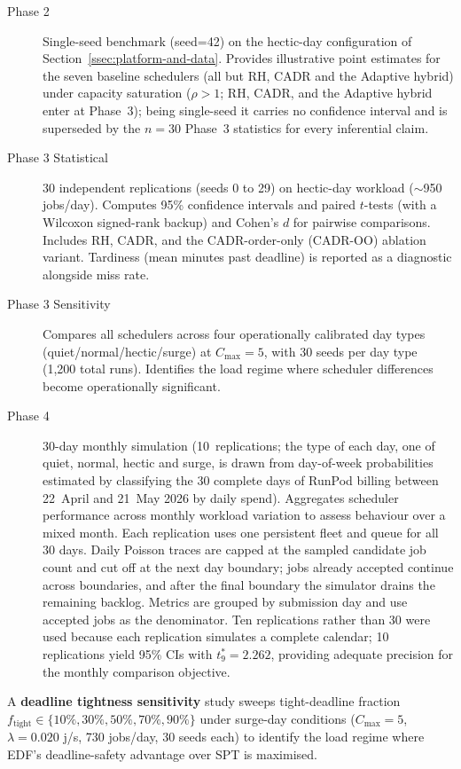 {\begin{description}
  \item[Phase 2] Single-seed benchmark (seed=42) on the hectic-day configuration of Section~\ref{ssec:platform-and-data}. Provides illustrative point estimates for the seven baseline schedulers (all but RH, CADR and the Adaptive hybrid) under capacity saturation ($\rho>1$; RH, CADR, and the Adaptive hybrid enter at Phase~3); being single-seed it carries no confidence interval and is superseded by the $n=30$ Phase~3 statistics for every inferential claim.
  \item[Phase 3 Statistical] 30 independent replications (seeds 0 to 29) on hectic-day workload ($\sim$950 jobs/day). Computes 95\% confidence intervals and paired $t$-tests (with a Wilcoxon signed-rank backup) and Cohen's $d$ for pairwise comparisons. Includes RH, CADR, and the CADR-order-only (CADR-OO) ablation variant. Tardiness (mean minutes past deadline) is reported as a diagnostic alongside miss rate.
  \item[Phase 3 Sensitivity] Compares all schedulers across four operationally calibrated day types (quiet/normal/hectic/surge) at $C_{\max}=5$, with 30 seeds per day type (1{,}200 total runs). Identifies the load regime where scheduler differences become operationally significant.
  \item[Phase 4] 30-day monthly simulation (10~replications; the type of each day, one of quiet, normal, hectic and surge, is drawn from day-of-week probabilities estimated by classifying the 30 complete days of RunPod billing between 22~April and 21~May 2026 by daily spend). Aggregates scheduler performance across monthly workload variation to assess behaviour over a mixed month. Each replication uses one persistent fleet and queue for all 30 days. Daily Poisson traces are capped at the sampled candidate job count and cut off at the next day boundary; jobs already accepted continue across boundaries, and after the final boundary the simulator drains the remaining backlog. Metrics are grouped by submission day and use accepted jobs as the denominator. Ten replications rather than 30 were used because each replication simulates a complete calendar; 10 replications yield 95\% CIs with $t^*_9 = 2.262$, providing adequate precision for the monthly comparison objective.
\end{description}

A \textbf{deadline tightness sensitivity} study sweeps tight-deadline fraction $f_{\text{tight}} \in \{10\%,\allowbreak 30\%,\allowbreak 50\%,\allowbreak 70\%,\allowbreak 90\%\}$ under surge-day conditions ($C_{\max}=5$, $\lambda=0.020$ j/s, 730 jobs/day, 30 seeds each) to identify the load regime where EDF's deadline-safety advantage over SPT is maximised.

}

